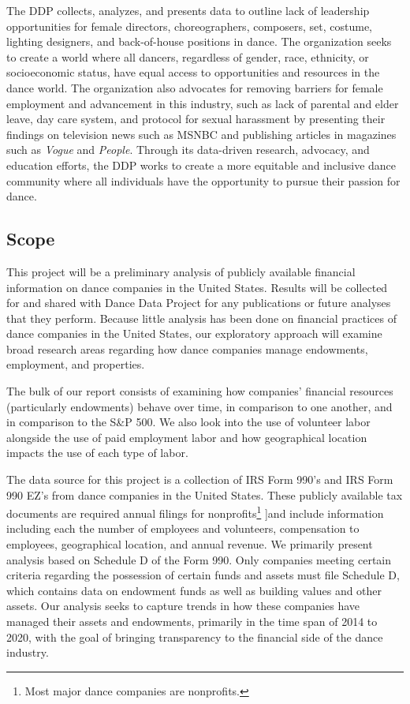 \documentclass[Dance Data
Project,article,submit,moreauthors,pdftex]{mdpi}
\begin{document}
The DDP collects, analyzes, and presents data to outline lack of
leadership opportunities for female directors, choreographers,
composers, set, costume, lighting designers, and back-of-house positions
in dance. The organization seeks to create a world where all dancers,
regardless of gender, race, ethnicity, or socioeconomic status, have
equal access to opportunities and resources in the dance world. The
organization also advocates for removing barriers for female employment
and advancement in this industry, such as lack of parental and elder
leave, day care system, and protocol for sexual harassment by presenting
their findings on television news such as MSNBC and publishing articles
in magazines such as \emph{Vogue} and \emph{People}. Through its
data-driven research, advocacy, and education efforts, the DDP works to
create a more equitable and inclusive dance community where all
individuals have the opportunity to pursue their passion for dance.

\hypertarget{scope-1}{%
\subsection{Scope}\label{scope-1}}

This project will be a preliminary analysis of publicly available
financial information on dance companies in the United States. Results
will be collected for and shared with Dance Data Project for any
publications or future analyses that they perform. Because little
analysis has been done on financial practices of dance companies in the
United States, our exploratory approach will examine broad research
areas regarding how dance companies manage endowments, employment, and
properties.

The bulk of our report consists of examining how companies' financial
resources (particularly endowments) behave over time, in comparison to
one another, and in comparison to the S\&P 500. We also look into the
use of volunteer labor alongside the use of paid employment labor and
how geographical location impacts the use of each type of labor.

The data source for this project is a collection of IRS Form 990's and
IRS Form 990 EZ's from dance companies in the United States. These
publicly available tax documents are required annual filings for
nonprofits\footnote{Most major dance companies are nonprofits.} {]}and
include information including each the number of employees and
volunteers, compensation to employees, geographical location, and annual
revenue. We primarily present analysis based on Schedule D of the Form
990. Only companies meeting certain criteria regarding the possession of
certain funds and assets must file Schedule D, which contains data on
endowment funds as well as building values and other assets. Our
analysis seeks to capture trends in how these companies have managed
their assets and endowments, primarily in the time span of 2014 to 2020,
with the goal of bringing transparency to the financial side of the
dance industry.
\end{document}
